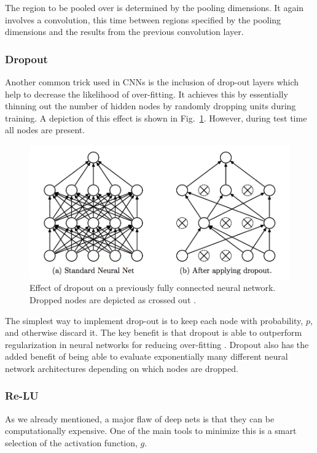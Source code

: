 \documentclass[12pt, twocolumn]{article}
\begin{document}
The region to be pooled over is determined by the pooling dimensions. It again involves a convolution, this time between regions specified by the pooling dimensions and the results from the previous convolution layer. 

\subsubsection{Dropout}

Another common trick used in CNNs is the inclusion of drop-out layers which help to decrease the likelihood of over-fitting. It achieves this by essentially thinning out the number of hidden nodes by randomly dropping units during training.  A depiction of this effect is shown in Fig.~\ref{fig:dropout}. However, during test time all nodes are present. 
\begin{figure}
\includegraphics[scale=.52]{dropout.png}

\caption{Effect of dropout on a previously fully connected neural network. Dropped nodes are depicted as crossed out \cite{Dropout}. }
\label{fig:dropout}
\end{figure}

The simplest way to implement drop-out is to keep each node with probability, $p$, and otherwise discard it. The key benefit is that dropout is able to outperform regularization in neural networks for reducing over-fitting \cite{Dropout}. Dropout also has the added benefit of being able to evaluate exponentially many different neural network architectures depending on which nodes are dropped.
 
\subsubsection{Re-LU}

As we already mentioned, a major flaw of deep nets is that they can be computationally expensive. One of the main tools to minimize this is a smart selection of the activation function, $g$. 
\end{document}
